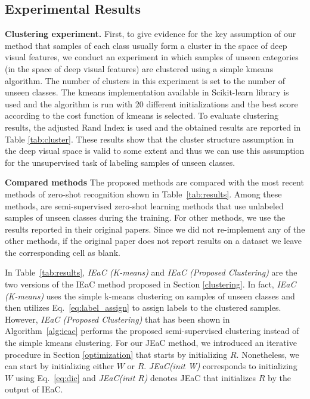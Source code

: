 \documentclass[10pt,twocolumn,letterpaper]{article}
\begin{document}
\subsection{Experimental Results}\label{results}
\textbf{Clustering experiment.}
First,  to  give  evidence  for  the  key  assumption  of  our method that samples of each class usually form
 a cluster in the space of deep visual features, we conduct an experiment in which samples of unseen categories
  (in the space of deep visual features) are clustered using a simple kmeans algorithm.
The number of clusters in this experiment is set to the number of unseen classes.
The kmeans implementation available in Scikit-learn library \cite{scikit-learn}
is used and the algorithm is run with 20 different initializations and the best score according
to the cost function of kmeans is selected. To evaluate clustering results,
the adjusted Rand Index is used and the obtained results are reported in Table \ref{tab:cluster}.
These results show that the cluster structure assumption in the deep visual space is valid to some extent and
thus we can use this assumption for the unsupervised task of labeling samples of unseen classes.


\textbf{Compared methods}
The proposed methods are compared with the most recent methods of zero-shot recognition shown in Table~\ref{tab:results}.
Among these methods, \cite{semi15,li15max} are semi-supervised zero-shot learning methods that use unlabeled samples of unseen classes during the training.
For other methods, we use the results reported in their original papers.
Since we did not re-implement any of the other methods, if the original paper does not report results on a dataset we leave the corresponding cell as blank.

In Table~\ref{tab:results}, \textit{IEaC (K-means)} and \textit{IEaC (Proposed Clustering)} are the two versions of the IEaC method proposed
 in Section \ref{clustering}.
  In fact, \textit{IEaC (K-means)} uses the simple k-means clustering on samples
   of unseen classes and then utilizes Eq.~\ref{eq:label_assign} to assign labels to the clustered samples.
  However, \textit{IEaC (Proposed Clustering)} that has been shown in Algorithm~\ref{alg:ieac} performs
   the proposed semi-supervised clustering instead of the simple kmeans clustering. For our JEaC method,
 we introduced an iterative procedure in Section \ref{optimization} that starts by initializing $R$.
  Nonetheless, we can start by initializing either $W$ or $R$.
   \textit{JEaC(init W)} corresponds to initializing $W$ using Eq.~\eqref{eq:dic}
   and \textit{JEaC(init R)} denotes JEaC that initializes $R$ by the output of IEaC.
%
\end{document}
